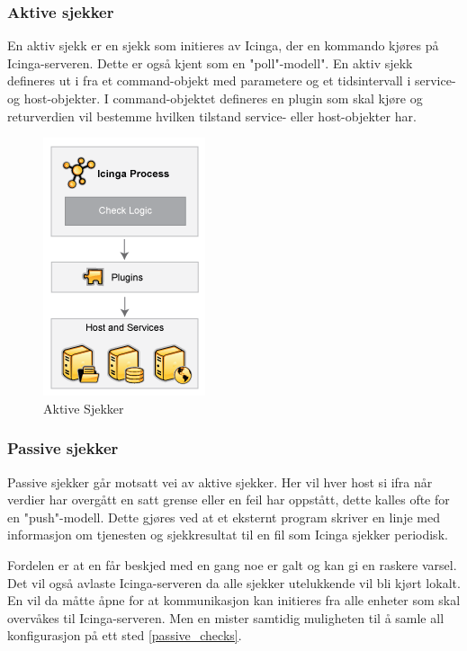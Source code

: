 \subsubsection{Aktive sjekker}
En aktiv sjekk er en sjekk som initieres av Icinga, der en kommando kjøres på Icinga-serveren. Dette er også kjent som en "poll"-modell". En aktiv sjekk defineres ut i fra et command-objekt med parametere og et tidsintervall i service- og host-objekter. I command-objektet defineres en plugin som skal kjøre og returverdien vil bestemme hvilken tilstand service- eller host-objekter har. 

\begin{figure}[H]
   \centering 
   \includegraphics{img/activechecks.png}
    \caption{Aktive Sjekker}
    \label{active_checks}
\end{figure}

\subsubsection{Passive sjekker}
Passive sjekker går motsatt vei av aktive sjekker. Her vil hver host si ifra når verdier har overgått en satt grense eller en feil har oppstått, dette kalles ofte for en "push"-modell. Dette gjøres ved at et eksternt program skriver en linje med informasjon om tjenesten og sjekkresultat til en fil som Icinga sjekker periodisk.

Fordelen er at en får beskjed med en gang noe er galt og kan gi en raskere varsel. Det vil også avlaste Icinga-serveren da alle sjekker utelukkende vil bli kjørt lokalt. En vil da måtte åpne for at kommunikasjon kan initieres fra alle enheter som skal overvåkes til Icinga-serveren. Men en mister samtidig muligheten til å samle all konfigurasjon på ett sted \ref{passive_checks}.

